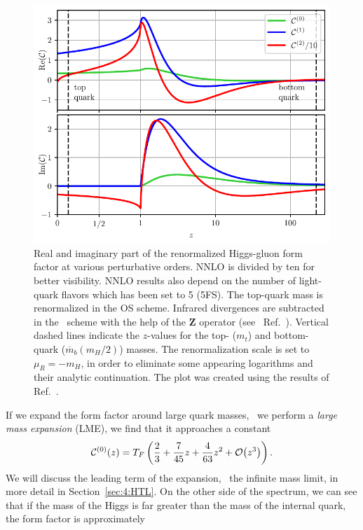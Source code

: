 \begin{figure}[ht]
\centering
\includegraphics[width=\figurewidth]{Images/form_factor.pdf}
\caption{Real and imaginary part of the renormalized Higgs-gluon form factor at various perturbative orders. \acs{NNLO} is divided by ten for better visibility. \acs{NNLO} results also depend on the number of light-quark flavors which has been set to 5 (5\acs{FS}). The top-quark mass is renormalized in the \acs{OS} scheme. Infrared divergences are subtracted in the \MS\ scheme with the help of the $\mathbf{Z}$ operator (see \eg\ Ref.~\cite{Czakon:2014oma}). Vertical dashed lines indicate the $z$-values for the top- ($m_t$) and bottom-quark ($\overline{m}_b(m_H/2)$) masses. The renormalization scale is set to $\mu_R = -m_H$, in order to eliminate some appearing logarithms and their analytic continuation. The plot was created using the results of Ref.~\cite{Czakon:2020vql}.}
\label{fig:4:form_factor}
\end{figure}
If we expand the form factor around large quark masses, \ie\ we perform a \textit{large mass expansion} (\acs{LME}), we find that it approaches a constant
\begin{equation}
\mathcal{C}^{(0)}(z) = T_F \left( \frac{2}{3} + \frac{7}{45} z + \frac{4}{63} z^2 + \mathcal{O}\!\left(z^3\right) \right).
\label{eq:4:LME}
\end{equation}
We will discuss the leading term of the expansion, \ie\ the infinite mass limit, in more detail in Section~\ref{sec:4:HTL}. On the other side of the spectrum, we can see that if the mass of the Higgs is far greater than the mass of the internal quark, the form factor is approximately
